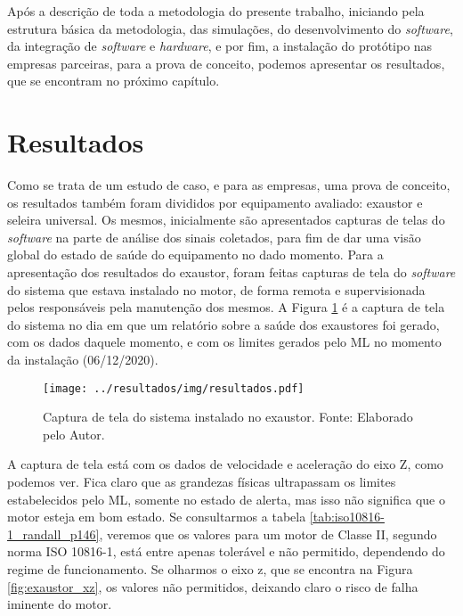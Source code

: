 \documentclass[a4paper]{ifacconf}
\begin{document}
Após a descrição de toda a metodologia do presente trabalho, iniciando pela estrutura básica da metodologia, das simulações, do desenvolvimento
do \textit{software}, da integração de \textit{software} e \textit{hardware}, e por fim, a instalação do protótipo nas empresas parceiras, para a prova de conceito, 
podemos apresentar os resultados, que se encontram no próximo capítulo.


\section{Resultados}

Como se trata de um estudo de caso, e para as empresas, uma prova de conceito, os resultados também foram divididos por equipamento avaliado:
exaustor e seleira universal. Os mesmos, inicialmente são apresentados capturas de telas do \textit{software} na parte de análise dos sinais 
coletados, para fim de dar uma visão global do estado de saúde do equipamento no dado momento. Para a apresentação dos resultados do exaustor,
foram feitas capturas de tela do \textit{software} do sistema que estava instalado no motor, de forma remota e supervisionada pelos 
responsáveis pela manutenção dos mesmos. A Figura \ref{fig:exaustor_1} é a captura de tela do sistema no dia em que um relatório sobre a saúde 
dos exaustores foi gerado, com os dados daquele momento, e com os limites gerados pelo ML no momento da instalação (06/12/2020).

\begin{figure}[h!]
  \begin{center}
      \texttt{[image: ../resultados/img/resultados.pdf]}
  \end{center}
  \caption{Captura de tela do sistema instalado no exaustor. Fonte: Elaborado pelo Autor.}
  \label{fig:exaustor_1}
\end{figure}

A captura de tela está com os dados de velocidade e aceleração do eixo Z, como podemos ver. Fica claro que as grandezas físicas
ultrapassam os limites estabelecidos pelo ML, somente no estado de alerta, mas isso não significa que o motor esteja em bom estado.
Se consultarmos a tabela \ref{tab:iso10816-1_randall_p146}, veremos que os valores para um motor de Classe II, segundo norma  ISO 10816-1, está 
entre apenas tolerável e não permitido, dependendo do regime de funcionamento. 
Se olharmos o eixo z, que se encontra na Figura \ref{fig:exaustor_xz}, os valores não permitidos, deixando claro o risco de falha iminente do 
motor.
\end{document}
